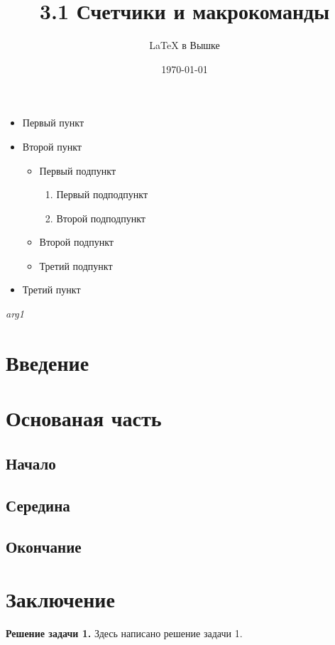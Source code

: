 \documentclass[a4paper,14pt]{article}
\author{\LaTeX{} в Вышке}
\title{3.1 Счетчики и макрокоманды}
\date{\today}
\theoremstyle{plain} %
\theoremstyle{definition} %
\theoremstyle{remark} %
\begin{document}

\maketitle

\begin{itemize}
	\item Первый пункт
	\item Второй пункт
	\begin{itemize}
		\item Первый подпункт
		\begin{enumerate}
			\item Первый подподпункт
			\item Второй подподпункт
		\end{enumerate}
		\item Второй подпункт
		\item Третий подпункт
	\end{itemize}
	\item Третий пункт
\end{itemize}

\newcommand{\ti}[1]{\textit{#1}} 

\ti{arg1}

\renewcommand{\thesection}{\Alph{section}}
\renewcommand{\thesubsection}
{\thesection\arabic{subsection}}

\section{Введение}
\section{Основаная часть}
\subsection{Начало}
\subsection{Середина}
\subsection{Окончание}
\section{Заключение}

\tableofcontents

\newcommand{\problem}[1]{\par\bigskip\noindent
	\textbf{Решение задачи #1.}\enskip\ignorespaces}

\problem{1} Здесь написано решение задачи 1.
\end{document}
